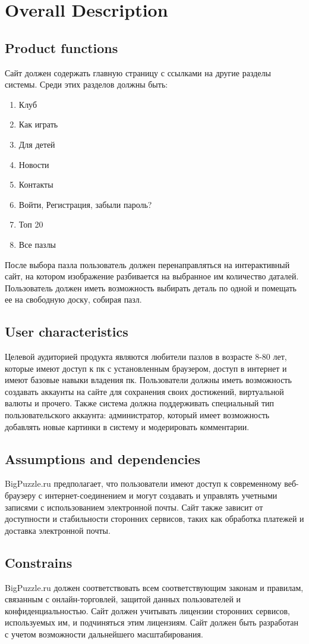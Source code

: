 \documentclass[12pt]{article}
\begin{document}
\section{Overall Description}
\subsection{Product functions}
Сайт должен содержать главную страницу с ссылками на другие разделы системы. Среди этих разделов должны быть:
\begin{enumerate}[itemsep=0.12ex]
    \item Клуб
    \item Как играть
    \item Для детей
    \item Новости
    \item Контакты
    \item Войти, Регистрация, забыли пароль?
    \item Топ 20
    \item Все пазлы
\end{enumerate}
После выбора пазла пользователь должен перенаправляться на интерактивный сайт, на котором изображение разбивается на выбранное им количество даталей. Пользователь должен иметь возможность выбирать деталь по одной и помещать ее на свободную доску, собирая пазл.
\subsection{User characteristics}
Целевой аудиторией продукта являются любители пазлов в возрасте 8-80 лет, которые имеют доступ к пк с установленным браузером, доступ в интернет и имеют базовые навыки владения пк.
Пользователи должны иметь возможность создавать аккаунты на сайте для сохранения своих достижений, виртуальной валюты и прочего.
Также система должна поддерживать специальный тип пользовательского аккаунта: администратор, который имеет возможность добавлять новые картинки в систему и модерировать комментарии.
\subsection{Assumptions and dependencies}
BigPuzzle.ru предполагает, что пользователи имеют доступ к современному веб-браузеру с интернет-соединением и могут создавать и управлять учетными записями с использованием электронной почты. Сайт также зависит от доступности и стабильности сторонних сервисов, таких как обработка платежей и доставка электронной почты.
\subsection{Constrains}
BigPuzzle.ru должен соответствовать всем соответствующим законам и правилам, связанным с онлайн-торговлей, защитой данных пользователей и конфиденциальностью. Сайт должен учитывать лицензии сторонних сервисов, используемых им, и подчиняться этим лицензиям. Сайт должен быть разработан с учетом возможности дальнейшего масштабирования.
\end{document}

